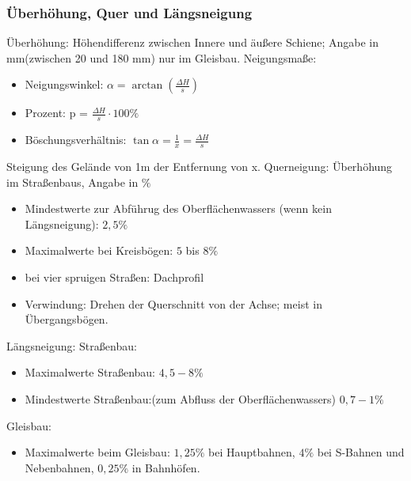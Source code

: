 \documentclass[12pt]{article}
\begin{document}
\subsubsection{Überhöhung, Quer und Längsneigung}
Überhöhung: Höhendifferenz zwischen Innere und äußere Schiene; Angabe in mm(zwischen 20 und 180 mm) nur im Gleisbau. \newline
Neigungsmaße: \newline
\begin{itemize}
\item Neigungswinkel: $\alpha =  \arctan (\frac{\Delta H}{s})$
\item Prozent: p = $\frac{\Delta H}{s} \cdot 100\%$
\item Böschungsverhältnis: $\tan \alpha = \frac{1}{x} = \frac{\Delta H}{s}$ 
\end{itemize}
Steigung des Gelände von 1m der Entfernung von x. \newline
\newline
Querneigung: Überhöhung im Straßenbaus, Angabe in $\%$
\begin{itemize}
\item Mindestwerte zur Abführug des Oberflächenwassers (wenn kein Längsneigung): $2,5 \%$
\item Maximalwerte bei Kreisbögen: $5$ bis $8\%$
\item bei vier spruigen Straßen: Dachprofil
\item Verwindung: Drehen der Querschnitt von der Achse; meist in Übergangsbögen.
\end{itemize}
Längsneigung: \newline
Straßenbau:
\begin{itemize}
\item Maximalwerte Straßenbau: $4,5 - 8\%$
\item Mindestwerte Straßenbau:(zum Abfluss der Oberflächenwassers) $0,7 - 1\%$
\end{itemize}
Gleisbau: 
\begin{itemize}
\item Maximalwerte beim Gleisbau: $1,25\%$ bei Hauptbahnen, $4\%$ bei S-Bahnen und Nebenbahnen, $0,25\%$ in Bahnhöfen.
\end{itemize}
\end{document}
